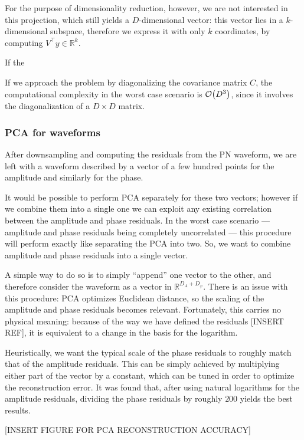 \documentclass[main.tex]{subfiles}
\begin{document}
For the purpose of dimensionality reduction, however, we are not interested in this projection, which still yields a \(D\)-dimensional vector: this vector lies in a \(k\)-dimensional subspace, therefore we  express it with only \(k\) coordinates, by computing \(V^{\top} y \in \mathbb{R}^{k}\). 

If the 

If we approach the problem by diagonalizing the covariance matrix \(C\), the computational complexity in the worst case scenario is \(\order{D^3}\), since it involves the diagonalization of a \(D \times D\) matrix.

\subsubsection{PCA for waveforms}

After downsampling and computing the residuals from the \ac{PN} waveform, we are left with a waveform described by a vector of a few hundred points for the amplitude and similarly for the phase. 

It would be possible to perform \ac{PCA} separately for these two vectors; however if we combine them into a single one we can exploit any existing correlation between the amplitude and phase residuals. 
In the worst case scenario --- amplitude and phase residuals being completely uncorrelated --- this procedure will perform exactly like separating the \ac{PCA} into two. 
So, we want to combine amplitude and phase residuals into a single vector. 

A simple way to do so is to simply ``append'' one vector to the other, and therefore consider the waveform as a vector in \(\mathbb{R}^{D_A + D_\varphi }\). 
There is an issue with this procedure: \ac{PCA} optimizes Euclidean distance, so the scaling of the amplitude and phase residuals becomes relevant. 
Fortunately, this carries no physical meaning: because of the way we have defined the residuals [INSERT REF], it is equivalent to a change in the basis for the logarithm. 

Heuristically, we want the typical scale of the phase residuals to roughly match that of the amplitude residuals. 
This can be simply achieved by multiplying either part of the vector by a constant, which can be tuned in order to optimize the reconstruction error. 
It was found that, after using natural logarithms for the amplitude residuals, dividing the phase residuals by roughly \(200\) yields the best results.

[INSERT FIGURE FOR PCA RECONSTRUCTION ACCURACY]
\end{document}
